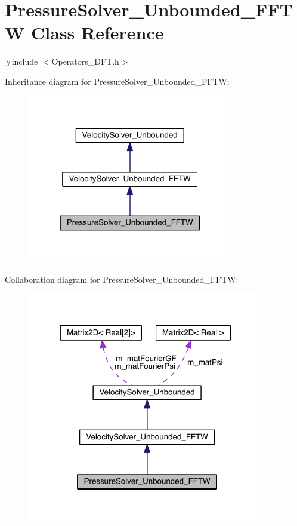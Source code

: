 \hypertarget{class_pressure_solver___unbounded___f_f_t_w}{}\section{Pressure\+Solver\+\_\+\+Unbounded\+\_\+\+F\+F\+T\+W Class Reference}
\label{class_pressure_solver___unbounded___f_f_t_w}


{\ttfamily \#include $<$Operators\+\_\+\+D\+F\+T.\+h$>$}



Inheritance diagram for Pressure\+Solver\+\_\+\+Unbounded\+\_\+\+F\+F\+T\+W\+:\nopagebreak
\begin{figure}[H]
\begin{center}
\leavevmode
\includegraphics[width=255pt]{db/db1/class_pressure_solver___unbounded___f_f_t_w__inherit__graph}
\end{center}
\end{figure}


Collaboration diagram for Pressure\+Solver\+\_\+\+Unbounded\+\_\+\+F\+F\+T\+W\+:\nopagebreak
\begin{figure}[H]
\begin{center}
\leavevmode
\includegraphics[width=294pt]{de/db9/class_pressure_solver___unbounded___f_f_t_w__coll__graph}
\end{center}
\end{figure}
